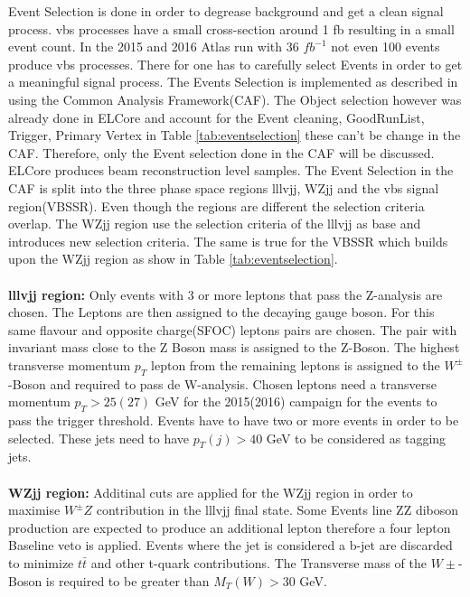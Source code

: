 \documentclass[../Bachelorarbeit.tex]{subfiles}
\begin{document}
Event Selection is done in order to degrease background and get a clean signal process. \acrshort{vbs} processes have
a small cross-section around 1 fb resulting in a small event count. In the 2015 and 2016 Atlas
run with 36 $fb^{-1}$ not even 100 events produce \acrshort{vbs} processes.
There for one has to carefully select Events in order to get a meaningful signal process. The Events Selection is implemented
as described in \cite{Bittrich.27.05.2020} using the Common Analysis Framework(CAF)\cite{ATLASGroup.}. The Object selection however was already done in ELCore
and account for the Event cleaning, GoodRunList, Trigger, Primary Vertex in Table \ref{tab:eventselection} these can't be change in the CAF.
Therefore, only the Event selection done in the CAF will be discussed. ELCore produces beam reconstruction
level samples. The Event Selection in the CAF is split into the three phase space regions lllvjj, WZjj and the \acrshort{vbs} signal region(VBSSR).
Even though the regions are different the selection criteria overlap. The WZjj region use the selection criteria of
the lllvjj as base and introduces new selection criteria.
The same is true for the VBSSR which builds upon the WZjj region as show in Table \ref{tab:eventselection}.
\\\\
\textbf{lllvjj region:} Only events with 3 or more leptons that pass the Z-analysis are chosen. The Leptons are then assigned to the decaying gauge boson.
For this same flavour and opposite charge(SFOC) leptons pairs are chosen. The pair with invariant mass close to the Z Boson mass is assigned to the Z-Boson.
The highest transverse momentum $p_{T}$ lepton from the remaining leptons is assigned to the $W^{\pm}$-Boson and required to pass de W-analysis.
Chosen leptons need a transverse momentum $p_{T} > 25(27)$ GeV for the 2015(2016) campaign for the events to pass the trigger threshold.
Events have to have two or more events in order to be selected. These jets need to have $p_{T}(j)>40$ GeV to be considered as tagging jets.
\\\\
\textbf{WZjj region:} Additinal cuts are applied for the WZjj region in order to maximise $W^{\pm}Z$ contribution in the lllvjj final state.
Some Events line ZZ diboson production are expected to produce an additional lepton therefore a four lepton Baseline veto is applied.
Events where the jet is considered a b-jet are discarded to minimize $t\bar{t}$ and other t-quark contributions.
The Transverse mass of the $W{\pm}$-Boson is required to be greater than $M_{T}(W)>30$ GeV.
\end{document}
